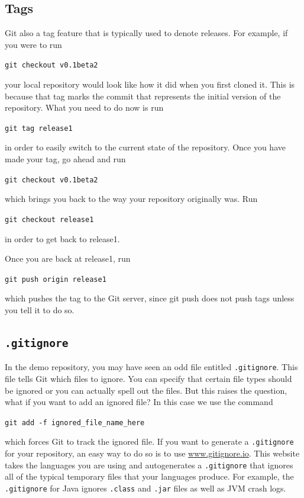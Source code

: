 \documentclass[notitlepage]{simple}
\begin{document}
\subsection{Tags}

Git also a tag feature that is typically used to denote releases.
For example, if you were to run
\begin{terminal}
	\verb|git checkout v0.1beta2|
\end{terminal}
your local repository would look like how it did when you first cloned it.
This is because that tag marks the commit that represents the initial version of the repository.
What you need to do now is run
\begin{terminal}
	\verb|git tag release1|
\end{terminal}
in order to easily switch to the current state of the repository.
Once you have made your tag, go ahead and run
\begin{terminal}
	\verb|git checkout v0.1beta2|
\end{terminal}
which brings you back to the way your repository originally was.
Run
\begin{terminal}
	\verb|git checkout release1|
\end{terminal}
in order to get back to release1.

Once you are back at release1, run
\begin{terminal}
	\verb|git push origin release1|
\end{terminal}
which pushes the tag to the Git server, since git push does not push tags unless you tell it to do so.

\subsection{\texttt{.gitignore}}

In the demo repository, you may have seen an odd file entitled \verb|.gitignore|.
This file tells Git which files to ignore.
You can specify that certain file types should be ignored or you can actually spell out the files.
But this raises the question, what if you want to add an ignored file?
In this case we use the command
\begin{terminal}
	\verb|git add -f ignored_file_name_here|
\end{terminal}
which forces Git to track the ignored file.
If you want to generate a \verb|.gitignore| for your repository, an easy way to do so is to use \url{www.gitignore.io}.
This website takes the languages you are using and autogenerates a \verb|.gitignore| that ignores all of the typical temporary files that your languages produce.
For example, the \verb|.gitignore| for Java ignores \verb|.class| and \verb|.jar| files as well as JVM crash logs.
\end{document}
